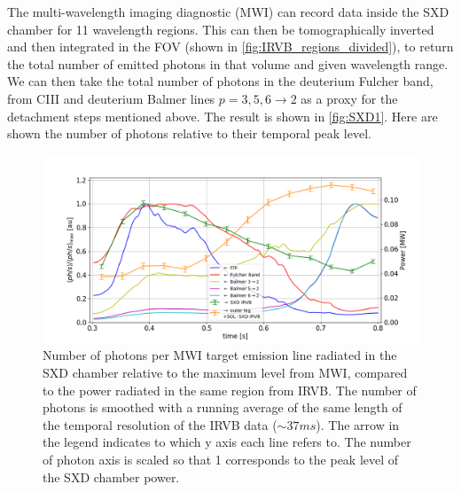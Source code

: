 The multi-wavelength imaging diagnostic (MWI) can record data inside the SXD chamber for 11 wavelength regions.\cite{Feng2021,Perek2019} This can then be tomographically inverted and then integrated in the FOV (shown in \autoref{fig:IRVB_regions_divided}), to return the total number of emitted photons in that volume and given wavelength range. We can then take the total number of photons in the deuterium Fulcher band, from CIII and deuterium Balmer lines $p=3, 5, 6 \rightarrow 2$ as a proxy for the detachment steps mentioned above. The result is shown in \autoref{fig:SXD1}. Here are shown the number of photons relative to their temporal peak level.
\begin{figure}[!ht]
	\centering
	\includegraphics[trim={40 0 25 50},clip,width=1\linewidth]{Chapters/chapter2/figs/IRVB-MASTU_shot-45371_pass1_bin7x3x3_gridres2cm_all_variables_absolute_small5.png}
	\caption{Number of photons per MWI target emission line radiated in the SXD chamber relative to the maximum level from MWI, compared to the power radiated in the same region from IRVB. The number of photons is smoothed with a running average of the same length of the temporal resolution of the IRVB data ($\sim37ms$). The arrow in the legend indicates to which y axis each line refers to. The number of photon axis is scaled so that 1 corresponds to the peak level of the SXD chamber power.}
	\label{fig:SXD1}
\end{figure}


